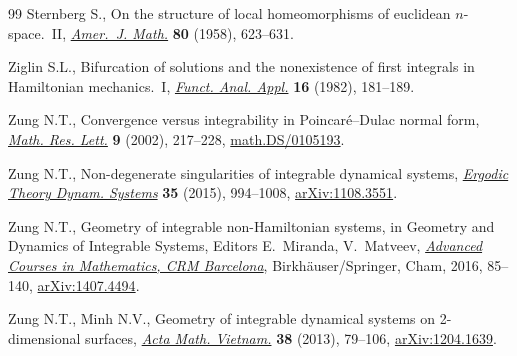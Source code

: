 \documentclass[pdftex]{sigma}
\numberwithin{equation}{section}
\begin{document}
\begin{thebibliography}{99}
Sternberg S., On the structure of local homeomorphisms of euclidean
 {$n$}-space.~{II}, \href{https://doi.org/10.2307/2372774}{\textit{Amer.~J. Math.}} \textbf{80} (1958), 623--631.

Ziglin S.L., Bifurcation of solutions and the nonexistence of f\/irst integrals
 in {H}amiltonian mechanics.~{I}, \href{https://doi.org/10.1007/BF01081586}{\textit{Funct. Anal. Appl.}} \textbf{16}
 (1982), 181--189.

Zung N.T., Convergence versus integrability in {P}oincar\'e--{D}ulac normal
 form, \href{http://dx.doi.org/10.4310/MRL.2002.v9.n2.a8}{\textit{Math. Res. Lett.}} \textbf{9} (2002), 217--228,
 \href{https://arxiv.org/abs/math.DS/0105193}{math.DS/0105193}.

Zung N.T., Non-degenerate singularities of integrable dynamical systems,
 \href{https://doi.org/10.1017/etds.2013.65}{\textit{Ergodic Theory Dynam. Systems}} \textbf{35} (2015), 994--1008,
 \href{https://arxiv.org/abs/1108.3551}{arXiv:1108.3551}.

Zung N.T., Geometry of integrable non-{H}amiltonian systems, in Geometry and
 Dynamics of Integrable Systems, Editors E.~Miranda, V.~Matveev, \href{https://doi.org/10.1007/978-3-319-33503-2_3}{\it Advanced
 Courses in Mathematics, CRM Barcelona}, Birkh\"auser/Springer, Cham, 2016,
 85--140, \href{https://arxiv.org/abs/1407.4494}{arXiv:1407.4494}.

Zung N.T., Minh N.V., Geometry of integrable dynamical systems on 2-dimensional
 surfaces, \href{https://doi.org/10.1007/s40306-012-0005-9}{\textit{Acta Math. Vietnam.}} \textbf{38} (2013), 79--106,
 \href{https://arxiv.org/abs/1204.1639}{arXiv:1204.1639}.

\end{thebibliography}\LastPageEnding
\end{document}
